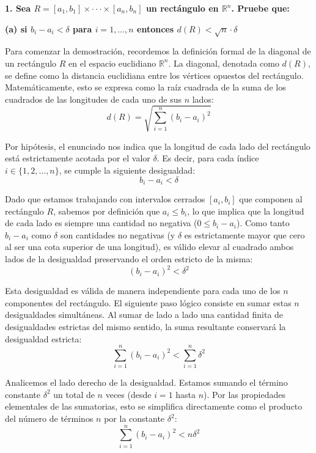 \documentclass[11pt,letterpaper]{article}
\begin{document}
\textbf{1. Sea $R=[a_{1},b_{1}]\times\cdot\cdot\cdot\times[a_{n},b_{n}]$ un rectángulo en $\mathbb{R}^{n}$. Pruebe que:}

\textbf{(a) si $b_{i}-a_{i}<\delta$ para $i=1,\dots,n$ entonces $d(R)<\sqrt{n}\cdot\delta$}

Para comenzar la demostración, recordemos la definición formal de la diagonal de un rectángulo $R$ en el espacio euclidiano $\mathbb{R}^{n}$. La diagonal, denotada como $d(R)$, se define como la distancia euclidiana entre los vértices opuestos del rectángulo. Matemáticamente, esto se expresa como la raíz cuadrada de la suma de los cuadrados de las longitudes de cada uno de sus $n$ lados:
\begin{equation*}
d(R) = \sqrt{\sum_{i=1}^{n} (b_{i}-a_{i})^{2}}
\end{equation*}

Por hipótesis, el enunciado nos indica que la longitud de cada lado del rectángulo está estrictamente acotada por el valor $\delta$. Es decir, para cada índice $i \in \{1, 2, \dots, n\}$, se cumple la siguiente desigualdad:
\begin{equation*}
b_{i}-a_{i} < \delta
\end{equation*}

Dado que estamos trabajando con intervalos cerrados $[a_{i}, b_{i}]$ que componen al rectángulo $R$, sabemos por definición que $a_{i} \le b_{i}$, lo que implica que la longitud de cada lado es siempre una cantidad no negativa ($0 \le b_{i}-a_{i}$). Como tanto $b_{i}-a_{i}$ como $\delta$ son cantidades no negativas (y $\delta$ es estrictamente mayor que cero al ser una cota superior de una longitud), es válido elevar al cuadrado ambos lados de la desigualdad preservando el orden estricto de la misma:
\begin{equation*}
(b_{i}-a_{i})^{2} < \delta^{2}
\end{equation*}

Esta desigualdad es válida de manera independiente para cada uno de los $n$ componentes del rectángulo. El siguiente paso lógico consiste en sumar estas $n$ desigualdades simultáneas. Al sumar de lado a lado una cantidad finita de desigualdades estrictas del mismo sentido, la suma resultante conservará la desigualdad estricta:
\begin{equation*}
\sum_{i=1}^{n} (b_{i}-a_{i})^{2} < \sum_{i=1}^{n} \delta^{2} 
\end{equation*}

Analicemos el lado derecho de la desigualdad. Estamos sumando el término constante $\delta^{2}$ un total de $n$ veces (desde $i=1$ hasta $n$). Por las propiedades elementales de las sumatorias, esto se simplifica directamente como el producto del número de términos $n$ por la constante $\delta^{2}$:
\begin{equation*}
\sum_{i=1}^{n} (b_{i}-a_{i})^{2} < n\delta^{2}
\end{equation*}
\end{document}

